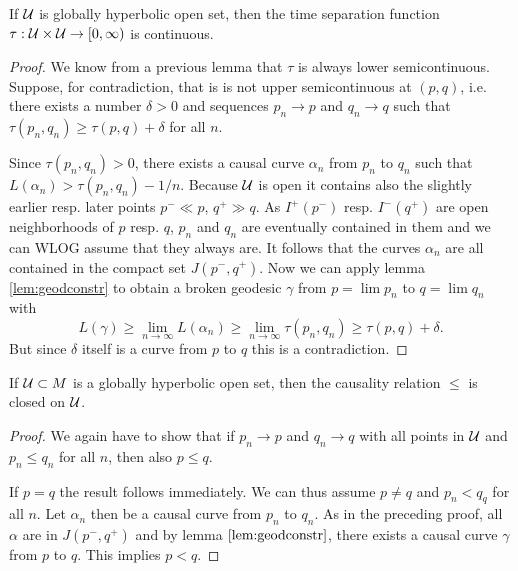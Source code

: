 \begin{lemma}\label{lem:tsfcont}
If $\mathcal{U}$ is globally hyperbolic open set, then the time separation function $\tau:\mathcal{U}\times\mathcal{U}\to [0,\infty)$ is continuous.
\end{lemma}
\begin{proof}
We know from a previous lemma that $\tau$ is always lower semicontinuous. Suppose, for contradiction, that is is not upper semicontinuous at $(p,q)$, i.e. there exists a number $\delta>0$ and sequences $p_n\to p$ and $q_n\to q$ such that $\tau(p_n,q_n) \ge \tau(p,q) + \delta$ for all $n$.

Since $\tau(p_n,q_n)>0$, there exists a causal curve $\alpha_n$ from $p_n$ to $q_n$ such that $L(\alpha_n)>\tau(p_n,q_n) - 1/n$. Because $\mathcal{U}$ is open it contains also the slightly earlier resp. later points $p^-\ll p$, $q^+\gg q$. As $I^+(p^-)$ resp. $I^-(q^+)$ are open neighborhoods of $p$ resp. $q$, $p_n$ and $q_n$ are eventually contained in them and we can WLOG assume that they always are. It follows that the curves $\alpha_n$ are all contained in the compact set $J(p^-,q^+)$. Now we can apply lemma \ref{lem:geodconstr} to obtain a broken geodesic $\gamma$ from $p=\lim p_n$ to $q=\lim q_n$ with 
\[
L(\gamma) \ge \lim_{n\to\infty} L(\alpha_n) \ge \lim_{n\to\infty}\tau(p_n,q_n) \ge \tau(p,q) + \delta.
\]
But since $\delta$ itself is a curve from $p$ to $q$ this is a contradiction.
\end{proof}

\begin{lemma}
If $\mathcal{U}\subset M$ is a globally hyperbolic open set, then the causality relation $\leq$ is closed on $\mathcal{U}$.
\end{lemma}
\begin{proof}
We again have to show that if $p_n\to p$ and $q_n\to q$ with all points in $\mathcal{U}$ and $p_n \leq q_n$ for all $n$, then also $p\leq q$.

If $p=q$ the result follows immediately. We can thus assume $p\neq q$ and $p_n<q_q$ for all $n$. Let $\alpha_n$ then be a causal curve from $p_n$ to $q_n$. As in the preceding proof, all $\alpha$ are in $J(p^-,q^+)$ and by lemma $\ref{lem:geodconstr}$, there exists a causal curve $\gamma$ from $p$ to $q$. This implies $p<q$.
\end{proof}

